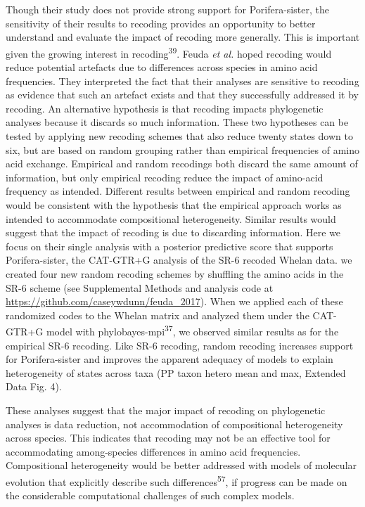 \documentclass[]{article}
\begin{document}
Though their study does not provide strong support for Porifera-sister,
the sensitivity of their results to recoding provides an opportunity to
better understand and evaluate the impact of recoding more generally.
This is important given the growing interest in
recoding\textsuperscript{39}. Feuda \emph{et al.} hoped recoding would
reduce potential artefacts due to differences across species in amino
acid frequencies. They interpreted the fact that their analyses are
sensitive to recoding as evidence that such an artefact exists and that
they successfully addressed it by recoding. An alternative hypothesis is
that recoding impacts phylogenetic analyses because it discards so much
information. These two hypotheses can be tested by applying new recoding
schemes that also reduce twenty states down to six, but are based on
random grouping rather than empirical frequencies of amino acid
exchange. Empirical and random recodings both discard the same amount of
information, but only empirical recoding reduce the impact of amino-acid
frequency as intended. Different results between empirical and random
recoding would be consistent with the hypothesis that the empirical
approach works as intended to accommodate compositional heterogeneity.
Similar results would suggest that the impact of recoding is due to
discarding information. Here we focus on their single analysis with a
posterior predictive score that supports Porifera-sister, the CAT-GTR+G
analysis of the SR-6 recoded Whelan data. we created four new random
recoding schemes by shuffling the amino acids in the SR-6 scheme (see
Supplemental Methods and analysis code at
\url{https://github.com/caseywdunn/feuda_2017}). When we applied each of
these randomized codes to the Whelan matrix and analyzed them under the
CAT-GTR+G model with phylobayes-mpi\textsuperscript{37}, we observed
similar results as for the empirical SR-6 recoding. Like SR-6 recoding,
random recoding increases support for Porifera-sister and improves the
apparent adequacy of models to explain heterogeneity of states across
taxa (PP taxon hetero mean and max, Extended Data Fig. 4).

These analyses suggest that the major impact of recoding on phylogenetic
analyses is data reduction, not accommodation of compositional
heterogeneity across species. This indicates that recoding may not be an
effective tool for accommodating among-species differences in amino acid
frequencies. Compositional heterogeneity would be better addressed with
models of molecular evolution that explicitly describe such
differences\textsuperscript{57}, if progress can be made on the
considerable computational challenges of such complex models.
\end{document}
